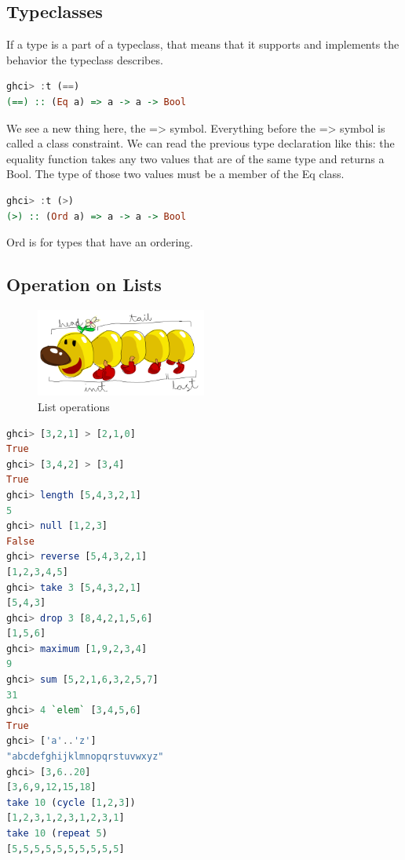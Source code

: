 \subsection{Typeclasses}

If a type is a part of a typeclass, that means that it supports and implements the behavior the typeclass describes.

\begin{lstlisting}[language=Haskell]
ghci> :t (==)  
(==) :: (Eq a) => a -> a -> Bool  
\end{lstlisting}

We see a new thing here, the => symbol. Everything before the => symbol is called a class constraint. We can read the previous type declaration like this: the equality function takes any two values that are of the same type and returns a Bool. The type of those two values must be a member of the Eq class.

\begin{lstlisting}[language=Haskell]
ghci> :t (>)  
(>) :: (Ord a) => a -> a -> Bool 
\end{lstlisting}

Ord is for types that have an ordering. 

\subsection{Operation on Lists}
\label{sec:Operationonlists}
\begin{figure}[H]
\centering
\includegraphics[width=0.5\textwidth]{figures/listOperations.png}
\caption{List operations}
\end{figure}

\begin{lstlisting}[language=Haskell]
ghci> [3,2,1] > [2,1,0]  
True  
ghci> [3,4,2] > [3,4]  
True
ghci> length [5,4,3,2,1]  
5
ghci> null [1,2,3]  
False 
ghci> reverse [5,4,3,2,1]  
[1,2,3,4,5] 
ghci> take 3 [5,4,3,2,1]  
[5,4,3]
ghci> drop 3 [8,4,2,1,5,6]  
[1,5,6] 
ghci> maximum [1,9,2,3,4]  
9  
ghci> sum [5,2,1,6,3,2,5,7]  
31
ghci> 4 `elem` [3,4,5,6]  
True 
ghci> ['a'..'z']  
"abcdefghijklmnopqrstuvwxyz"
ghci> [3,6..20]  
[3,6,9,12,15,18]
take 10 (cycle [1,2,3])  
[1,2,3,1,2,3,1,2,3,1]  
take 10 (repeat 5)  
[5,5,5,5,5,5,5,5,5,5]  
\end{lstlisting}

\clearpage